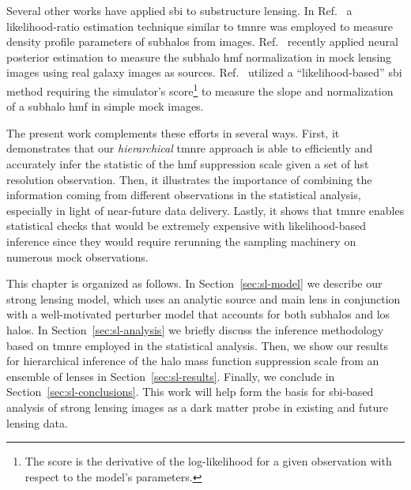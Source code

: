 Several other works have applied \gls*{sbi} to substructure lensing. In Ref.~\cite{Zhang:2022djp} a likelihood-ratio estimation technique similar to \gls*{tmnre} was employed to measure density profile parameters of subhalos from images. Ref.~\cite{Wagner-Carena:2022mrn} recently applied neural posterior estimation to measure the subhalo \gls*{hmf} normalization in mock lensing images using real galaxy images as sources. Ref.~\cite{Brehmer:2019jyt} utilized a ``likelihood-based'' \gls*{sbi} method requiring the simulator's score\footnote{
    The score is the derivative of the log-likelihood for a given observation with respect to the model's parameters.
} to measure the slope and normalization of a subhalo \gls*{hmf} in simple mock images.

The present work complements these efforts in several ways. First, it demonstrates that our \emph{hierarchical} \gls*{tmnre} approach is able to efficiently and accurately infer the statistic of the \gls*{hmf} suppression scale given a set of \gls*{hst} resolution observation. Then, it illustrates the importance of combining the information coming from different observations in the statistical analysis, especially in light of near-future data delivery. Lastly, it shows that \gls*{tmnre} enables statistical checks that would be extremely expensive with likelihood-based inference since they would require rerunning the sampling machinery on numerous mock observations.

This chapter is organized as follows. In Section~\ref{sec:sl-model} we describe our strong lensing model, which uses an analytic source and main lens in conjunction with a well-motivated perturber model that accounts for both subhalos and \gls*{los} halos. In Section~\ref{sec:sl-analysis} we briefly discuss the inference methodology based on \gls*{tmnre} employed in the statistical analysis. Then, we show our results for hierarchical inference of the halo mass function suppression scale from an ensemble of lenses in Section~\ref{sec:sl-results}. Finally, we conclude in Section~\ref{sec:sl-conclusions}. 
This work will help form the basis for \gls*{sbi}-based analysis of strong lensing images as a dark matter probe in existing and future lensing data.




